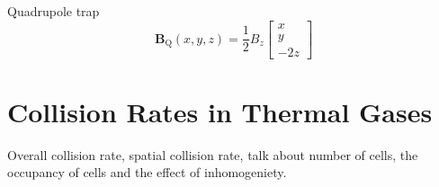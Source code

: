 Quadrupole trap
\begin{equation}
    \mathbf{B}_{\mathrm{Q}}(x,y,z) = \frac{1}{2} B_z \begin{bmatrix} x\\ y\\ -2z \end{bmatrix}
\end{equation}


\section{Collision Rates in Thermal Gases} \label{sec:collisionRates}

Overall collision rate, spatial collision rate, talk about number of cells, the occupancy of cells and the effect of inhomogeniety.
 
